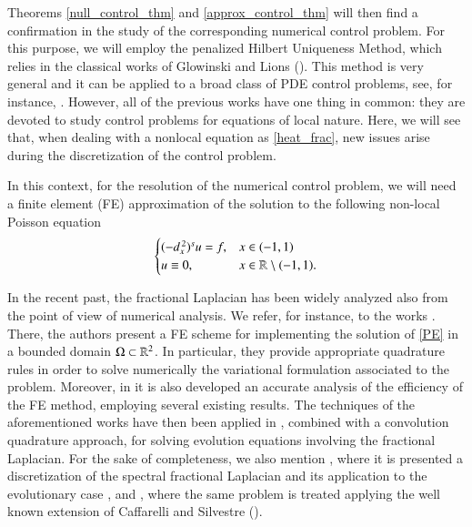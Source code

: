 Theorems \ref{null_control_thm} and \ref{approx_control_thm} will then find a confirmation in the study of the corresponding numerical control problem. For this purpose, we will employ the penalized Hilbert Uniqueness Method, which relies in the classical works of Glowinski and Lions (\cite{glowinski1995exact,glowinski2008exact}). This method is very general and it can be applied to a broad class of PDE control problems, see, for instance, \cite{boyer2013penalised,boyer2017insensitizing,boyer2014approximate,khodja2017partial}. However, all of the previous works have one thing in common: they are devoted to study control problems for equations of local nature. Here, we will see that, when dealing with a nonlocal equation as \eqref{heat_frac}, new issues arise during the discretization of the control problem. 

In this context, for the resolution of the numerical control problem, we will need a finite element (FE)  approximation of the solution to the following non-local Poisson equation
\begin{align}\label{PE}
	\begin{cases}
		(-d_x^{\,2})^{s}u = f, & x\in(-1,1)
		\\
		u\equiv 0, & x\in\mathbb{R}\setminus(-1,1).
	\end{cases}
\end{align}

In the recent past, the fractional Laplacian has been widely analyzed also from the point of view of numerical analysis. We refer, for instance, to the works \cite{acosta2017short,acosta2017fractional,borthagaray2017laplaciano}. There, the authors present a FE scheme for implementing the solution of \eqref{PE} in a bounded domain $\Omega\subset\mathbb{R}^2$. In particular, they provide appropriate quadrature rules in order to solve numerically the variational formulation associated to the problem. Moreover, in \cite{acosta2017fractional,borthagaray2017laplaciano} it is also developed an accurate analysis of the efficiency of the FE method, employing several existing results. The techniques of the aforementioned works have then been applied in \cite{acosta2017finite}, combined with a convolution quadrature approach, for solving evolution equations involving the fractional Laplacian. For the sake of completeness, we also mention \cite{bonito2015numerical}, where it is presented a discretization of the spectral fractional Laplacian and its application to the evolutionary case \cite{bonito2017approximation}, and \cite{nochetto2015pde}, where the same problem is treated applying the well known extension of Caffarelli and Silvestre (\cite{caffarelli2007extension}).   

